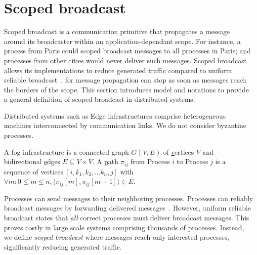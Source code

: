 

\vfill {}
\newpage

\section{Scoped broadcast}
\label{sec:scoped}

Scoped broadcast is a communication primitive that propagates a
message around its broadcaster within an application-dependant scope.
For instance, a process from Paris could scoped broadcast messages to
all processes in Paris; and processes from other cities would never
deliver such messages. Scoped broadcast allows its implementations to
reduce generated traffic compared to uniform reliable
broadcast~\cite{hadzilacos1994modular, raynal2013distributed}, for
message propagation can stop as soon as messages reach the borders of
the scope.  This section introduces model and notations to provide a
general definition of scoped broadcast in distributed
systems. 

Distributed systems such as Edge infrastructures comprise
heterogeneous machines interconnected by communication links. We do
not consider byzantine processes.

\begin{definition}
  A fog infrastructure is a connected \underline{g}raph $G(V, E)$ of
  \underline{v}ertices $V$ and bidirectional \underline{e}dges $E
  \subseteq V \times V$.  A \underline{p}ath $\pi_{ij}$ from Process
  $i$ to Process $j$ is a sequence of vertices $[i, k_1, k_2, \ldots
    k_n, j]$ with $\forall m: 0\leq m \leq n, \langle \pi_{ij}[m],
  \pi_{ij}[m+1] \rangle \in E$.
\end{definition}

Processes can send messages to their neighboring processes. Processes
can reliably broadcast messages by forwarding delivered
messages~\cite{birman1999bimodal, hadzilacos1994modular,
  nedelec2018causal, raynal2013distributed}. However, uniform reliable
broadcast states that \emph{all} correct processes must deliver
broadcast messages. This proves costly in large scale systems
comprising thousands of processes. Instead, we define \emph{scoped
broadcast} where messages reach only interested processes,
significantly reducing generated traffic. 

